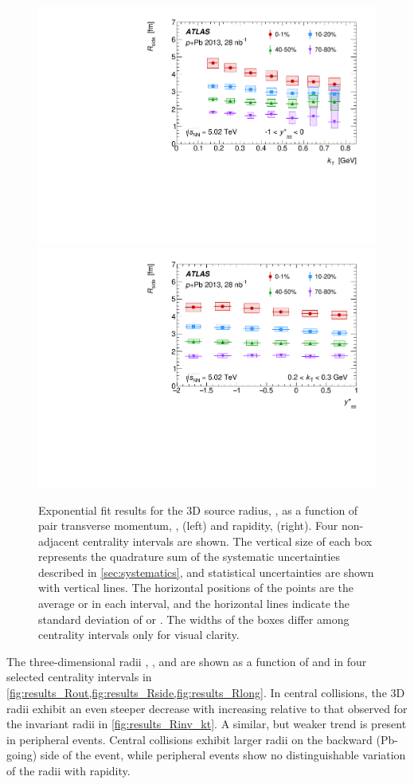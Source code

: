 \begin{figure}[t]
\centering
\includegraphics[width=.49\linewidth]{canqosl_Rside_vs_kt.pdf}
\includegraphics[width=.49\linewidth]{canqosl_Rside_vs_kys.pdf}
\caption{Exponential fit results for the 3D source radius, \Rside, as a function of pair transverse momentum, \kt, (left) and rapidity, \kys (right). Four non-adjacent centrality intervals are shown. The vertical size of each box represents the quadrature sum of the systematic uncertainties described in \cref{sec:systematics}, and statistical uncertainties are shown with vertical lines. The horizontal positions of the points are the average \kt or \kys in each interval, and the horizontal lines indicate the standard deviation of \kt or \kys. The widths of the boxes differ among centrality intervals only for visual clarity.}
\label{fig:results_Rside}
\end{figure}


The three-dimensional radii \Rout, \Rside, and \Rlong are shown as a function of \kt and \kys in four selected centrality intervals in \cref{fig:results_Rout,fig:results_Rside,fig:results_Rlong}.
In central collisions, the 3D radii exhibit an even steeper decrease with increasing \kt relative to that observed for the invariant radii in \cref{fig:results_Rinv_kt}.
A similar, but weaker trend is present in peripheral events.
Central collisions exhibit larger radii on the backward (Pb-going) side of the event, while peripheral events show no distinguishable variation of the radii with rapidity.

